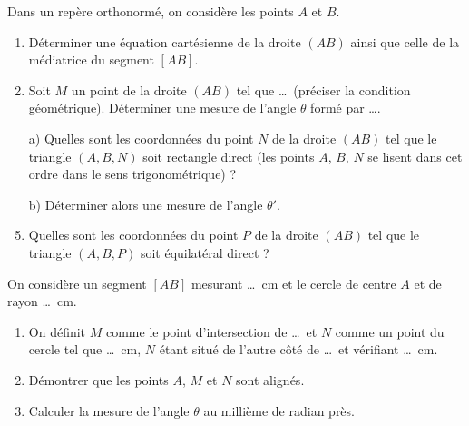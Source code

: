 \documentclass[11pt]{article}
\begin{document}
\begin{exercice}[4]
Dans un repère orthonormé, on considère les points $A$ et $B$.
\begin{enumerate}
  \item Déterminer une équation cartésienne de la droite $(AB)$ ainsi que celle de la médiatrice du segment $[AB]$.
  \item Soit $M$ un point de la droite $(AB)$ tel que \ldots\ (préciser la condition géométrique). Déterminer une mesure de l’angle $\theta$ formé par \ldots.
  \item[a)] Quelles sont les coordonnées du point $N$ de la droite $(AB)$ tel que le triangle $(A,B,N)$ soit rectangle direct (les points $A$, $B$, $N$ se lisent dans cet ordre dans le sens trigonométrique) ?
  \item[b)] Déterminer alors une mesure de l’angle $\theta'$.
  \item Quelles sont les coordonnées du point $P$ de la droite $(AB)$ tel que le triangle $(A,B,P)$ soit équilatéral direct ?
\end{enumerate}
\end{exercice}

\begin{exercice}[5]
On considère un segment $[AB]$ mesurant \ldots\ cm et le cercle de centre $A$ et de rayon \ldots\ cm.
\begin{enumerate}
  \item On définit $M$ comme le point d’intersection de \ldots\ et $N$ comme un point du cercle tel que \ldots\ cm, $N$ étant situé de l’autre côté de \ldots\ et vérifiant \ldots\ cm.
  \item Démontrer que les points $A$, $M$ et $N$ sont alignés.
  \item Calculer la mesure de l’angle $\theta$ au millième de radian près.
\end{enumerate}
\end{exercice}
\end{document}
